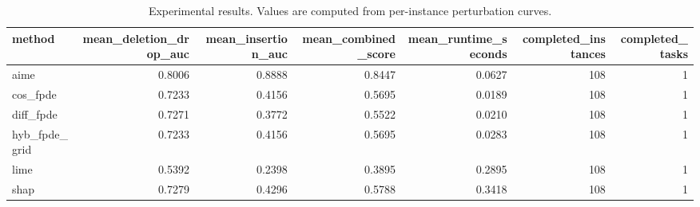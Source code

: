 \begin{table}[t]
\caption{Experimental results. Values are computed from per-instance perturbation curves.}
\label{tab:main_results_computed}
\centering
\begin{tabular}{lrrrrrr}
\toprule
method & mean\_deletion\_drop\_auc & mean\_insertion\_auc & mean\_combined\_score & mean\_runtime\_seconds & completed\_instances & completed\_tasks \\
\midrule
aime & 0.8006 & 0.8888 & 0.8447 & 0.0627 & 108 & 1 \\
cos\_fpde & 0.7233 & 0.4156 & 0.5695 & 0.0189 & 108 & 1 \\
diff\_fpde & 0.7271 & 0.3772 & 0.5522 & 0.0210 & 108 & 1 \\
hyb\_fpde\_grid & 0.7233 & 0.4156 & 0.5695 & 0.0283 & 108 & 1 \\
lime & 0.5392 & 0.2398 & 0.3895 & 0.2895 & 108 & 1 \\
shap & 0.7279 & 0.4296 & 0.5788 & 0.3418 & 108 & 1 \\
\bottomrule
\end{tabular}

\end{table}
